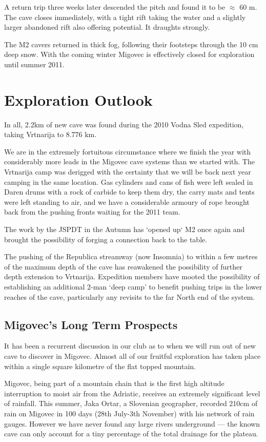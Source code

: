 \documentclass[english,a4]{article}
\begin{document}
A return trip three weeks later descended the pitch and found it to be
$\approx$ 60 m. The cave closes immediately, with a tight rift taking the water
and a slightly larger abandoned rift also offering potential. It draughts
strongly.

The M2 cavers returned in thick fog, following their footsteps through the 10
cm deep snow. With the coming winter Migovec is effectively closed for
exploration until summer 2011.

\section{Exploration Outlook}

In all, 2.2km of new cave was found during the 2010 Vodna Sled expedition,
taking Vrtnarija to 8.776 km.

We are in the extremely fortuitous circumstance where we finish the year with
considerably more leads in the Migovec cave systems than we started with.  The Vrtnarija camp
was derigged with the certainty that we will be back next year camping in the
same location. Gas cylinders and cans of fish were left sealed in Daren drums
with a rock of carbide to keep them dry, the carry mats and tents were left
standing to air, and we have a considerable armoury of rope brought back from
the pushing fronts waiting for the 2011 team.

The work by the JSPDT in the Autumn has `opened up` M2 once again and brought
the possibility of forging a connection back to the table. 

The pushing of the Republica streamway (now Insomnia) to within a few metres of
the maximum depth of the cave has reawakened the possibility of further depth
extension to Vrtnarija. Expedition members have mooted the possibility of
establishing an additional 2-man `deep camp' to benefit pushing trips in the
lower reaches of the cave, particularly any revisits to the far North end of
the system.

\subsection{Migovec's Long Term Prospects}

It has been a recurrent discussion in our club as to when we will run out of
new cave to discover in Migovec. Almost all of our fruitful exploration has
taken place within a single square kilometre of the flat topped mountain. 

Migovec, being part of a mountain chain that is the first high altitude
interruption to moist air from the Adriatic, receives an extremely significant
level of rainfall. This summer, Jaka Ortar, a Slovenian geographer, recorded
210cm of rain on Migovec in 100 days (28th July-3th November) with his network
of rain gauges. However we have never found any large rivers underground ---
the known cave can only account for a tiny percentage of the total drainage for
the plateau.
\end{document}
